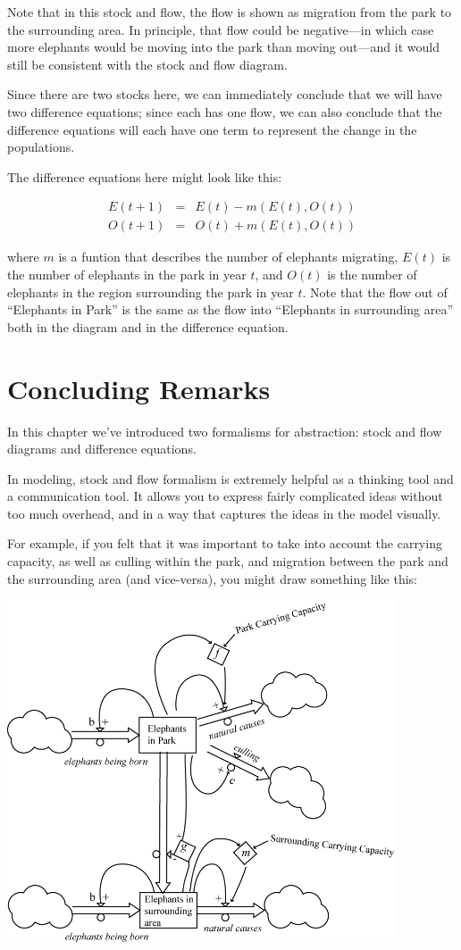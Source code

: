 Note that in this stock and flow, the flow is shown as migration from the park to the surrounding area.  In principle, that flow could be negative---in which case more elephants would be moving into the park than moving out---and it would still be consistent with the stock and flow diagram.  

Since there are two stocks here, we can immediately conclude that we will have two difference equations; since each has one flow, we can also conclude that the difference equations will each have one term to represent the change in the populations.

The difference equations here might look like this:

\begin{eqnarray*}
E(t+1) &=& E(t) -m(E(t),O(t)) \\
O(t+1) &=& O(t) +m(E(t),O(t))
\end{eqnarray*}

where $m$ is a funtion that describes the number of elephants migrating, $E(t)$ is the number of elephants in the park in year $t$, and $O(t)$ is the number of elephants in the region surrounding the park in year $t$.  Note that the flow out of ``Elephants in Park'' is the same as the flow into ``Elephants in surrounding area'' both in the diagram and in the difference equation.

\section{Concluding Remarks}

In this chapter we've introduced two formalisms for abstraction: stock and flow diagrams and difference equations.  

In modeling, stock and flow formalism is extremely helpful as a thinking tool and a communication tool.  It allows you to express fairly complicated ideas without too much overhead, and in a way that captures the ideas in the model visually.  

For example, if you felt that it was important to take into account the carrying capacity, as well as culling within the park, and migration between the park and the surrounding area (and vice-versa), you might draw something like this:

 \includegraphics[height=4in]{figs/ElephantStockAndFlow3}

